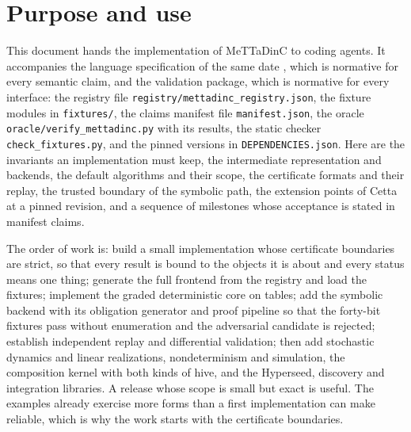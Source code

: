 \documentclass[11pt]{article}
\newcommand{\code}[1]{\texttt{#1}}
\begin{document}
\section*{Purpose and use}
This document hands the implementation of MeTTaDinC to coding agents. It accompanies the language
specification of the same date \cite{spec}, which is normative for every semantic claim, and the
validation package, which is normative for every interface: the registry file
\code{registry/mettadinc\_registry.json}, the fixture modules in \code{fixtures/}, the claims manifest
file \code{manifest.json}, the oracle \code{oracle/verify\_mettadinc.py} with its results, the static
checker \code{check\_fixtures.py}, and the pinned versions in \code{DEPENDENCIES.json}. Here are the
invariants an implementation must keep, the intermediate representation and backends, the default
algorithms and their scope, the certificate formats and their replay, the trusted boundary of the
symbolic path, the extension points of Cetta at a pinned revision, and a sequence of milestones whose
acceptance is stated in manifest claims.

The order of work is: build a small implementation whose certificate boundaries are strict, so that
every result is bound to the objects it is about and every status means one thing; generate the full
frontend from the registry and load the fixtures; implement the graded deterministic core on tables;
add the symbolic backend with its obligation generator and proof pipeline so that the forty-bit
fixtures pass without enumeration and the adversarial candidate is rejected; establish independent
replay and differential validation; then add stochastic dynamics and linear realizations,
nondeterminism and simulation, the composition kernel with both kinds of hive, and the Hyperseed,
discovery and integration libraries. A release whose scope is small but exact is useful. The
examples already exercise more forms than a first implementation can make reliable, which is why the
work starts with the certificate boundaries.
\end{document}
